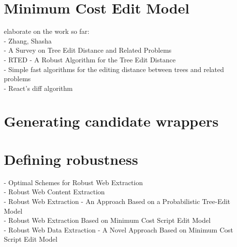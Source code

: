 \section{Minimum Cost Edit Model}

elaborate on the work so far:\\
- Zhang, Shasha\\
- A Survey on Tree Edit Distance and Related Problems\\
- RTED - A Robust Algorithm for the Tree Edit Distance\\
- Simple fast algorithms for the editing distance between trees and related problems\\
- React’s diff algorithm\\


\section{Generating candidate wrappers}


\section{Defining robustness}

- Optimal Schemes for Robust Web Extraction\\
- Robust Web Content Extraction\\
- Robust Web Extraction - An Approach Based on a Probabilistic Tree-Edit Model\\
- Robust Web Extraction Based on Minimum Cost Script Edit Model\\
- Robust Web Data Extraction - A Novel Approach Based on Minimum Cost Script Edit Model\\

